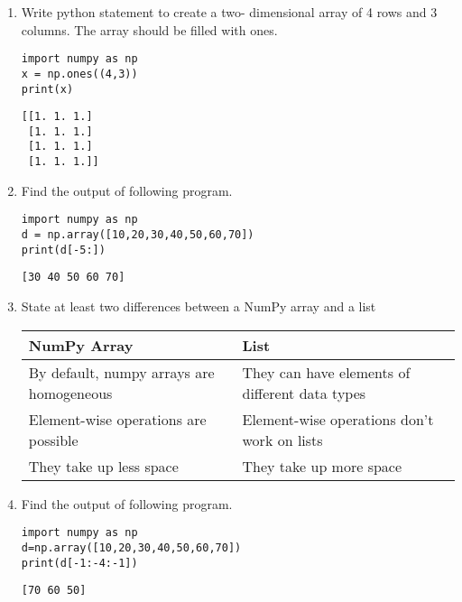 \documentclass[11pt]{article}
\begin{document}
\begin{enumerate}
\begin{verbatim}
[2 4 6]
[4 8 2]
\end{verbatim}

\item Write python statement to create a two- dimensional array of 4 rows and 3 columns. The array should be filled with ones.
\begin{verbatim}
import numpy as np
x = np.ones((4,3))
print(x)
\end{verbatim}

\begin{verbatim}
[[1. 1. 1.]
 [1. 1. 1.]
 [1. 1. 1.]
 [1. 1. 1.]]
\end{verbatim}

\item Find the output of following program.
\begin{verbatim}
import numpy as np
d = np.array([10,20,30,40,50,60,70])
print(d[-5:])
\end{verbatim}

\begin{verbatim}
[30 40 50 60 70]
\end{verbatim}

\item State at least two differences between a NumPy array and a list
\begin{center}
\begin{tabular}{|l|l|}
\hline
NumPy Array & List\\
\hline
By default, numpy arrays are homogeneous & They can have elements of different data types\\
Element-wise operations are possible & Element-wise operations don’t work on lists\\
They take up less space & They take up more space\\
\hline
\end{tabular}
\end{center}

\item Find the output of following program.
\begin{verbatim}
import numpy as np
d=np.array([10,20,30,40,50,60,70])
print(d[-1:-4:-1])
\end{verbatim}

\begin{verbatim}
[70 60 50]
\end{verbatim}


\end{enumerate}
\end{document}
